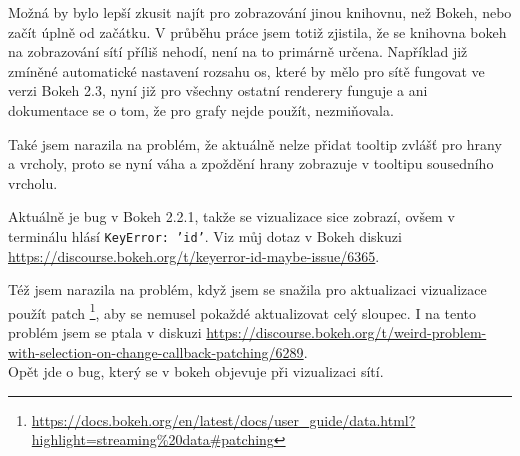 \documentclass[a4paper,12pt]{article}
\begin{document}
Možná by bylo lepší zkusit najít pro zobrazování jinou knihovnu, než Bokeh, nebo začít úplně od začátku.
V průběhu práce jsem totiž zjistila, že se knihovna bokeh na zobrazování sítí příliš nehodí, není na to primárně určena.
Například již zmíněné automatické nastavení rozsahu os, které by mělo pro sítě fungovat ve verzi Bokeh 2.3, 
nyní již pro všechny ostatní renderery funguje a ani dokumentace se o tom, že pro grafy nejde použít, nezmiňovala.

Také jsem narazila na problém, že aktuálně nelze přidat tooltip zvlášť pro hrany a vrcholy, proto se nyní
váha a zpoždění hrany zobrazuje v tooltipu sousedního vrcholu.

Aktuálně je bug v Bokeh 2.2.1, takže se vizualizace sice zobrazí, ovšem v terminálu hlásí \texttt{KeyError: 'id'}.
Viz můj dotaz v Bokeh diskuzi \url{https://discourse.bokeh.org/t/keyerror-id-maybe-issue/6365}.

Též jsem narazila na problém, když jsem se snažila pro aktualizaci vizualizace použít patch
\footnote{\url{https://docs.bokeh.org/en/latest/docs/user\_guide/data.html?highlight=streaming\%20data\#patching}},
aby se nemusel pokaždé aktualizovat celý sloupec. I na tento problém jsem se ptala v diskuzi
\url{https://discourse.bokeh.org/t/weird-problem-with-selection-on-change-callback-patching/6289}.\\
Opět jde o bug, který se v bokeh objevuje při vizualizaci sítí.
\end{document}
